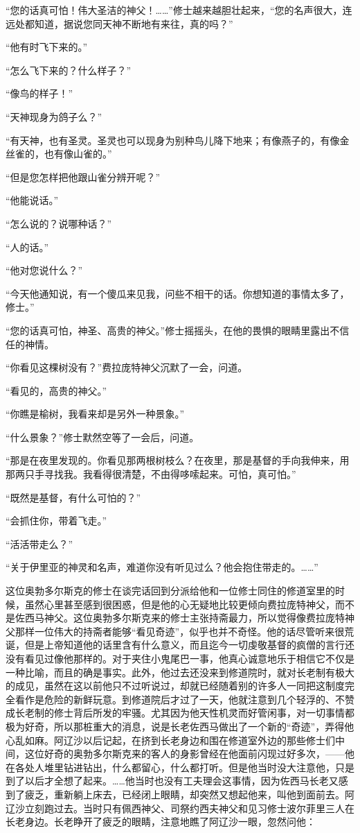 \par “您的话真可怕！伟大圣洁的神父！……”修士越来越胆壮起来，“您的名声很大，连远处都知道，据说您同天神不断地有来往，真的吗？”
\par “他有时飞下来的。”
\par “怎么飞下来的？什么样子？”
\par “像鸟的样子！”
\par “天神现身为鸽子么？”
\par “有天神，也有圣灵。圣灵也可以现身为别种鸟儿降下地来；有像燕子的，有像金丝雀的，也有像山雀的。”
\par “但是您怎样把他跟山雀分辨开呢？”
\par “他能说话。”
\par “怎么说的？说哪种话？”
\par “人的话。”
\par “他对您说什么？”
\par “今天他通知说，有一个傻瓜来见我，问些不相干的话。你想知道的事情太多了，修士。”
\par “您的话真可怕，神圣、高贵的神父。”修士摇摇头，在他的畏惧的眼睛里露出不信任的神情。
\par “你看见这棵树没有？”费拉庞特神父沉默了一会，问道。
\par “看见的，高贵的神父。”
\par “你瞧是榆树，我看来却是另外一种景象。”
\par “什么景象？”修士默然空等了一会后，问道。
\par “那是在夜里发现的。你看见那两根树枝么？在夜里，那是基督的手向我伸来，用那两只手寻找我。我看得很清楚，不由得哆嗦起来。可怕，真可怕。”
\par “既然是基督，有什么可怕的？”
\par “会抓住你，带着飞走。”
\par “活活带走么？”
\par “关于伊里亚的神灵和名声，难道你没有听见过么？他会抱住带走的。……”
\par 这位奥勃多尔斯克的修士在谈完话回到分派给他和一位修士同住的修道室里的时候，虽然心里甚至感到很困惑，但是他的心无疑地比较更倾向费拉庞特神父，而不是佐西马神父。这位奥勃多尔斯克来的修士主张持斋最力，所以觉得像费拉庞特神父那样一位伟大的持斋者能够“看见奇迹”，似乎也并不奇怪。他的话尽管听来很荒诞，但是上帝知道他的话里含有什么意义，而且迄今一切虔敬基督的疯僧的言行还没有看见过像他那样的。对于夹住小鬼尾巴一事，他真心诚意地乐于相信它不仅是一种比喻，而且的确是事实。此外，他过去还没来到修道院时，就对长老制有极大的成见，虽然在这以前他只不过听说过，却就已经随着别的许多人一同把这制度完全看作是危险的新鲜玩意。到修道院后才过了一天，他就注意到几个轻浮的、不赞成长老制的修士背后所发的牢骚。尤其因为他天性机灵而好管闲事，对一切事情都极为好奇，所以那桩重大的消息，说是长老佐西马做出了一个新的“奇迹”，弄得他心乱如麻。阿辽沙以后记起，在挤到长老身边和围在修道室外边的那些修士们中间，这位好奇的奥勃多尔斯克来的客人的身影曾经在他面前闪现过好多次，——他在各处人堆里钻进钻出，什么都留心，什么都打听。但是他当时没大注意他，只是到了以后才全想了起来。……他当时也没有工夫理会这事情，因为佐西马长老又感到了疲乏，重新躺上床去，已经闭上眼睛，却突然又想起他来，叫他到面前去。阿辽沙立刻跑过去。当时只有佩西神父、司祭约西夫神父和见习修士波尔菲里三人在长老身边。长老睁开了疲乏的眼睛，注意地瞧了阿辽沙一眼，忽然问他：
